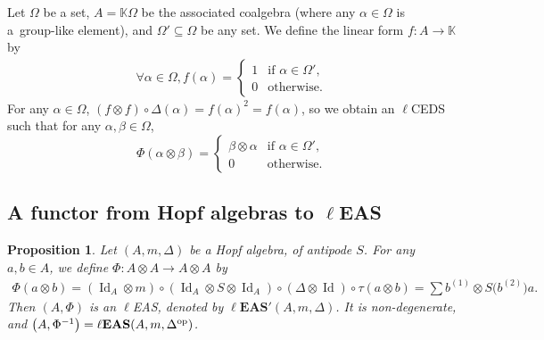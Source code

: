 \documentclass[10pt,a4paper]{amsart}
\numberwithin{equation}{section}
\newtheorem{Proposition}[Theorem]{Proposition}
 { \theoremstyle{definition}
\newtheorem{Definition}[Theorem]{Definition}
\newtheorem{Note}[Theorem]{Note}
\newtheorem{Example}[Theorem]{Example}
\newtheorem{Remark}[Theorem]{Remark}
\newtheorem{Notation}[Theorem]{Notation}}
\newcommand{\leas}{\ell\mathbf{EAS}}
\begin{document}
\begin{Example}
Let $\Omega$ be a set, $A=\mathbb{K}\Omega$ be the associated coalgebra (where any $\alpha \in \Omega$ is a~group-like element), and $\Omega'\subseteq \Omega$ be any set. We define the linear form $f\colon A\longrightarrow \mathbb{K}$ by
\begin{align*}
 \forall \alpha \in \Omega, f(\alpha) =\begin{cases}
1& \text{if }\alpha \in \Omega',\\
0 & \text{otherwise}.
\end{cases} \end{align*}
For any $\alpha \in \Omega$, $(f\otimes f)\circ \Delta(\alpha)=f(\alpha)^2=f(\alpha)$, so we obtain an $\ell$CEDS such that for any $\alpha,\beta \in \Omega$,
\[\Phi(\alpha \otimes \beta)=\begin{cases}
\beta\otimes \alpha&\text{if }\alpha \in \Omega',\\
0 & \text{otherwise}.
\end{cases}\] \end{Example}


\subsection[A functor from Hopf algebras to lEAS]{A functor from Hopf algebras to $\boldsymbol{\ell}$EAS}

\begin{Proposition}\label{prop5.7}
Let $(A,m,\Delta)$ be a Hopf algebra, of antipode $S$. For any $a,b\in A$, we define $\Phi\colon A\otimes A\longrightarrow A\otimes A$ by
\begin{gather*}
\Phi(a\otimes b)=(\operatorname{Id}_A\otimes m)\circ (\operatorname{Id}_A\otimes S\otimes \operatorname{Id}_A)\circ (\Delta \otimes \operatorname{Id})\circ \tau(a\otimes b)=\sum b^{(1)}\otimes S\bigl(b^{(2)}\bigr)a.
\end{gather*}
Then $(A,\Phi)$ is an $\ell$EAS, denoted by $\leas'(A,m,\Delta)$. It is non-degenerate, and $\bigl(A,\Phi^{-1}\bigr)=\leas(A,m,\Delta^{\rm op})$.
\end{Proposition}
\end{document}
